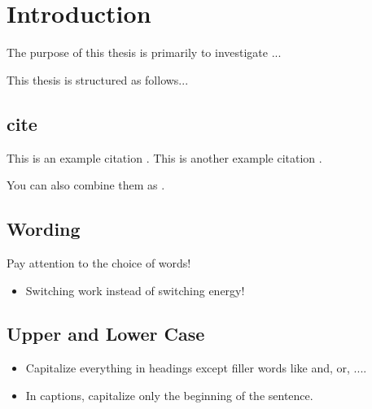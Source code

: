 \chapter{Introduction}
\label{cha:introduction}

The purpose of this thesis is primarily to investigate ...


This thesis is structured as follows...


\section{cite}

This is an example citation \cite{WaBo2016}. This is another example citation \cite{wallscheid2014real}.

You can also combine them as \cite{WaBo2016,wallscheid2014real}.


\section{Wording}
Pay attention to the choice of words!
\begin{itemize}
	\item Switching work instead of switching energy!
\end{itemize}

\section{Upper and Lower Case}
\begin{itemize}
    \item Capitalize everything in headings except filler words like and, or, ....
    \item In captions, capitalize only the beginning of the sentence.
\end{itemize}




